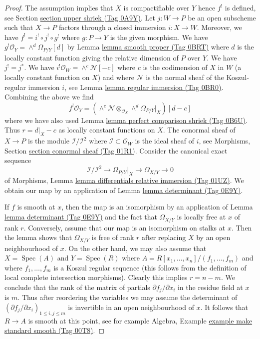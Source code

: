 \documentclass{amsart}
\theoremstyle{plain}
\theoremstyle{definition}
\theoremstyle{remark}
\numberwithin{equation}{subsection}
\def\Spec{\mathop{\mathrm{Spec}}}
\begin{document}
\begin{proof}
The assumption implies that $X$ is compactifiable over $Y$ hence $f^!$
is defined, see Section \href{https://stacks.math.columbia.edu/tag/0A9Y}{section upper shriek (Tag 0A9Y)}.
Let $j : W \to P$ be an open subscheme such that
$X \to P$ factors through a closed immersion $i : X \to W$.
Moreover, we have $f^! = i^! \circ j^! \circ g^!$ where
$g : P \to Y$ is the given morphism.
We have $g^!\mathcal{O}_Y = \wedge^d\Omega_{P/Y}[d]$ by
Lemma \href{https://stacks.math.columbia.edu/tag/0BRT}{lemma smooth proper (Tag 0BRT)} where $d$ is the locally
constant function giving the relative dimension of $P$ over $Y$.
We have $j^! = j^*$. We have $i^!\mathcal{O}_W = \wedge^c\mathcal{N}[-c]$
where $c$ is the codimension of $X$ in $W$ (a locally constant
function on $X$) and where $\mathcal{N}$ is the normal sheaf of
the Koszul-regular immersion $i$, see Lemma \href{https://stacks.math.columbia.edu/tag/0BR0}{lemma regular immersion (Tag 0BR0)}.
Combining the above we find
$$
f^!\mathcal{O}_Y =
\left(\wedge^c\mathcal{N} \otimes_{\mathcal{O}_X}
\wedge^d\Omega_{P/Y}|_X\right)[d - c]
$$
where we have also used Lemma \href{https://stacks.math.columbia.edu/tag/0B6U}{lemma perfect comparison shriek (Tag 0B6U)}.
Thus $r = d|_X - c$ as locally constant functions on $X$.
The conormal sheaf of $X \to P$ is the module
$\mathcal{I}/\mathcal{I}^2$ where $\mathcal{I} \subset \mathcal{O}_W$
is the ideal sheaf of $i$, see
Morphisms, Section \href{https://stacks.math.columbia.edu/tag/01R1}{section conormal sheaf (Tag 01R1)}.
Consider the canonical exact sequence
$$
\mathcal{I}/\mathcal{I}^2 \to
\Omega_{P/Y}|_X \to \Omega_{X/Y} \to 0
$$
of Morphisms, Lemma \href{https://stacks.math.columbia.edu/tag/01UZ}{lemma differentials relative immersion (Tag 01UZ)}.
We obtain our map by an application of Lemma \href{https://stacks.math.columbia.edu/tag/0E9Y}{lemma determinant (Tag 0E9Y)}.

\medskip\noindent
If $f$ is smooth at $x$, then the map is an isomorphism by an application of
Lemma \href{https://stacks.math.columbia.edu/tag/0E9Y}{lemma determinant (Tag 0E9Y)}
and the fact that $\Omega_{X/Y}$ is locally free at $x$
of rank $r$. Conversely, assume that our map is an isomorphism on stalks
at $x$. Then the lemma shows that $\Omega_{X/Y}$ is free of rank $r$
after replacing $X$ by an open neighbourhood of $x$.
On the other hand, we may also assume that $X = \Spec(A)$ and
$Y = \Spec(R)$ where $A = R[x_1, \ldots, x_n]/(f_1, \ldots, f_m)$
and where $f_1, \ldots, f_m$ is a Koszul regular sequence
(this follows from the definition of local complete intersection morphisms).
Clearly this implies $r = n - m$. We conclude that the rank of the matrix
of partials $\partial f_j/\partial x_i$ in the residue field at $x$ is $m$.
Thus after reordering the variables we may assume
the determinant of $(\partial f_j/\partial x_i)_{1 \leq i, j \leq m}$
is invertible in an open neighbourhood of $x$. It follows
that $R \to A$ is smooth at this point, see for example
Algebra, Example \href{https://stacks.math.columbia.edu/tag/00T8}{example make standard smooth (Tag 00T8)}.
\end{proof}
\end{document}

